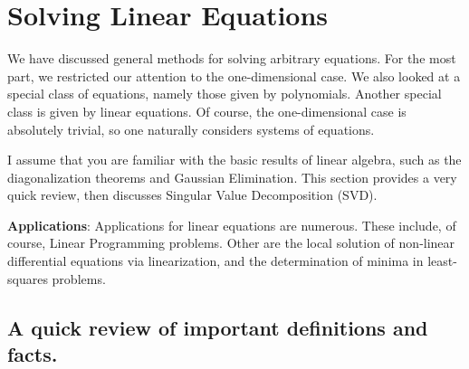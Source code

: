 \chapter{Solving Linear Equations}

We have discussed general methods for solving arbitrary equations. For the most part, we restricted our attention to the one-dimensional case. We also looked at a special class of equations, namely those given by polynomials. Another special class is given by linear equations. Of course, the one-dimensional case is absolutely trivial, so one naturally considers systems of equations. 

I assume that you are familiar with the basic results of linear algebra, such as the diagonalization theorems and Gaussian Elimination. This section provides a very quick review, then discusses Singular Value Decomposition (SVD).

\medskip
\noindent \textbf{Applications}: Applications for linear equations are numerous. These include, of course, Linear Programming problems. Other are the local solution of non-linear differential equations via linearization, and the determination of minima in least-squares problems. 

\newpage

\section{A quick review of important definitions and facts.}

